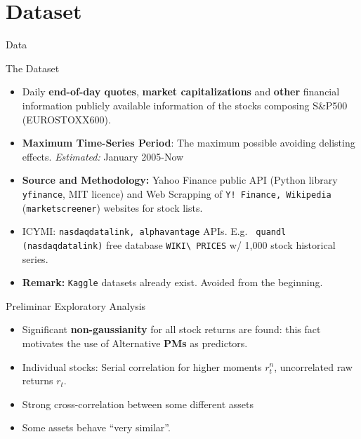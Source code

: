 \documentclass[ucs,8pt,handout]{beamer}
\begin{document}
\section{Dataset}
\begin{frame}{Data}
  \begin{block}{The Dataset}
    \begin{itemize}
    \item Daily {\bf end-of-day quotes}, {\bf market capitalizations}
      and {\bf other} financial information publicly available
      information of the stocks composing S\&P500 (EUROSTOXX600).
      
    \item {\bf Maximum Time-Series Period}: The maximum possible avoiding
      delisting effects. {\sl Estimated:} January 2005-Now

    \item {\bf Source and Methodology:} Yahoo Finance public API
      (Python library {\tt yfinance}, MIT licence) and Web Scrapping
      of {\tt Y! Finance, Wikipedia} ({\tt marketscreener}) websites
      for stock lists.
      \item ICYMI: {\tt nasdaqdatalink, alphavantage} APIs. E.g. {\tt
        quandl (nasdaqdatalink)} free database {\tt WIKI\textbackslash
          PRICES} w/ 1,000 stock historical series. 
    \item {\bf Remark:} {\tt Kaggle} datasets already exist. Avoided
      from the beginning.
    \end{itemize}
    \end{block}

  \begin{block}{Preliminar Exploratory Analysis}
\begin{itemize}
    \item Significant {\bf non-gaussianity} for all stock returns are
      found: this fact motivates the use of Alternative {\bf PMs} as
      predictors.
    \item Individual stocks: Serial correlation for higher moments
      $r^n_t$, uncorrelated raw returns $r_t$.
    \item Strong cross-correlation between some different assets
    \item Some assets behave ``very similar''.
\end{itemize}
\end{block}
  
\end{frame}
\end{document}
